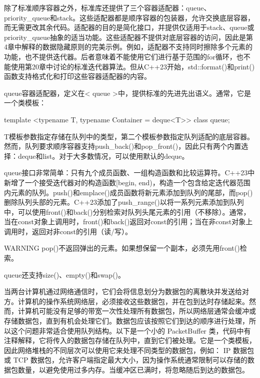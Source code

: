 
除了标准顺序容器之外，标准库还提供了三个容器适配器：queue、priority\_queue和stack。这些适配器都是顺序容器的包装器，允许交换底层容器，而无需更改其余代码。适配器的目的是简化接口，并提供仅适用于stack、queue或priority\_queue抽象的适当功能。这些适配器不提供对底层容器的访问，因此是第4章中解释的数据隐藏原则的完美示例。例如，适配器不支持同时擦除多个元素的功能，也不提供迭代器。后者意味着不能使用它们进行基于范围的for循环，也不能使用第20章中讨论的标准迭代器算法。但从C++23开始，std::format()和print()函数支持格式化和打印这些容器适配器的内容。


queue容器适配器，定义在< queue >中，提供标准的先进先出语义。通常，它是一个类模板：

\begin{cpp}
template <typename T, typename Container = deque<T>> class queue;
\end{cpp}

T模板参数指定存储在队列中的类型，第二个模板参数指定队列适配的底层容器。然而，队列要求顺序容器支持push\_back()和pop\_front()，因此只有两个内置选择：deque和list。对于大多数情况，可以使用默认的deque。


queue接口非常简单：只有九个成员函数、一组构造函数和比较运算符。C++23中新增了一个接受迭代器对的构造函数[begin, end)，构造一个包含给定迭代器范围内元素的队列。push()和emplace()成员函数将新元素添加到队列的尾部，而pop()删除队列头部的元素。C++23添加了push\_range()以将一系列元素添加到队列中，可以使用front()和back()分别检索对队列头尾元素的引用（不移除）。通常，当在const对象上调用时，front()和back()返回对const的引用；当在非const对象上调用时，返回对非const的引用（读/写）。

\begin{myWarning}{WARNING}
pop()不返回弹出的元素。如果想保留一个副本，必须先用front()检索。
\end{myWarning}

queue还支持size()、empty()和swap()。


当两台计算机通过网络通信时，它们会将信息划分为数据包的离散块并发送给对方。计算机的操作系统网络层，必须接收这些数据包，并在包到达时存储起来。然而，计算机可能没有足够的带宽一次性处理所有数据包，所以网络层通常会缓冲或存储数据包，直到有机会处理它们。数据包应该按照它们到达的顺序进行处理，所以这个问题非常适合使用队列结构。以下是一个小的 PacketBuffer 类，代码中有注释解释，它将传入的数据包存储在队列中，直到它们被处理。它是一个类模板，因此网络堆栈的不同层次可以使用它来处理不同类型的数据包，例如： IP 数据包或 TCP 数据包，允许客户端指定最大大小，因为操作系统通常限制可以存储的数据包数量，以避免使用过多内存。当缓冲区已满时，将忽略随后到达的数据包。

